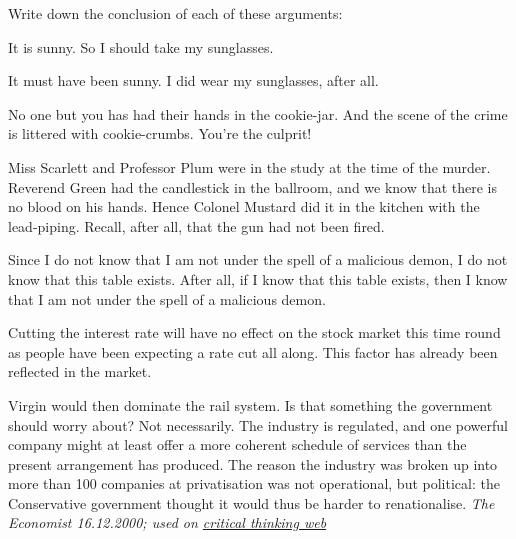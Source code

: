\begin{practiceproblems}
\problempart
Write down the conclusion of each of these arguments:
\begin{earg}
	\item It is sunny. So I should take my sunglasses.
	\item It must have been sunny. I did wear my sunglasses, after all.
	\item No one but you has had their hands in the cookie-jar. And the scene of the crime is littered with cookie-crumbs. You're the culprit!
	\item Miss Scarlett and Professor Plum were in the study at the time of the murder. Reverend Green had the candlestick in the ballroom, and we know that there is no blood on his hands. Hence Colonel Mustard did it in the kitchen with the lead-piping. Recall, after all, that the gun had not been fired.
	\item  Since I do not know that I am not under the spell of a malicious demon, I do not know that this table exists. After all, if I know that this table exists, then I know that I am not under the spell of a malicious demon.
	\item Cutting the interest rate will have no effect on the stock market this time round as people have been expecting a rate cut all along. This factor has already been reflected in the market.
	\item Virgin would then dominate the rail system. Is that something the government should worry about? Not necessarily. The industry is regulated, and one powerful company might at least offer a more coherent schedule of services than the present arrangement has produced. The reason the industry was broken up into more than 100 companies at privatisation was not operational, but political: the Conservative government thought it would thus be harder to renationalise. \emph{The Economist 16.12.2000; used on \href{https://philosophy.hku.hk/think/arg/arg.php}{critical thinking web}}

\end{earg}
\end{practiceproblems}
